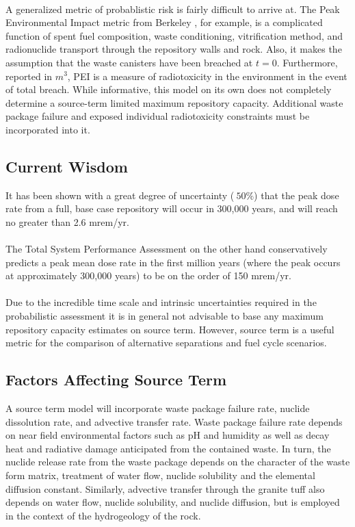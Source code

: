 \paragraph{}
A generalized metric of probablistic risk is fairly difficult to arrive at. The Peak Environmental Impact metric from Berkeley \cite{bouvier_comparison_2007}, for example, is a complicated function of spent fuel composition, waste conditioning, vitrification method, and radionuclide transport through the repository walls and rock. Also, it makes the assumption that the waste canisters have been breached at $t=0$. Furthermore, reported in $m^3$, PEI is a measure of radiotoxicity in the environment in the event of total breach. While informative, this model on its own does not completely determine a source-term limited maximum repository capacity. Additional waste package failure and exposed individual radiotoxicity constraints must be incorporated into it.
\subsection{Current Wisdom}
It has been shown with a great degree of uncertainty ($~50\%$) that the peak dose rate from a full, base case repository will occur in 300,000 years, and will reach no greater than 2.6 mrem/yr.\cite{li_methodology_2006}
\paragraph{}
The Total System Performance Assessment on the other hand conservatively predicts a peak mean dose rate in the first million years (where the peak occurs at approximately 300,000 years) to be on the order of 150 mrem/yr.\cite{williams_contract_2001} 
\paragraph{}
Due to the incredible time scale and intrinsic uncertainties required in the probabilistic assessment it is in general not advisable to base any maximum repository capacity estimates on source term. However, source term is a useful metric for the comparison of alternative separations and fuel cycle scenarios.

\subsection{Factors Affecting Source Term}
A source term model will incorporate waste package failure rate, nuclide dissolution rate, and advective transfer rate. Waste package failure rate depends on near field environmental factors such as pH and humidity as well as decay heat and radiative damage anticipated from the contained waste. In turn, the nuclide release rate from the waste package depends on the character of the waste form matrix, treatment of water flow, nuclide solubility and the elemental diffusion constant. Similarly, advective transfer through the granite tuff also depends on water flow, nuclide solubility, and nuclide diffusion, but is employed in the context of the hydrogeology of the rock.   
